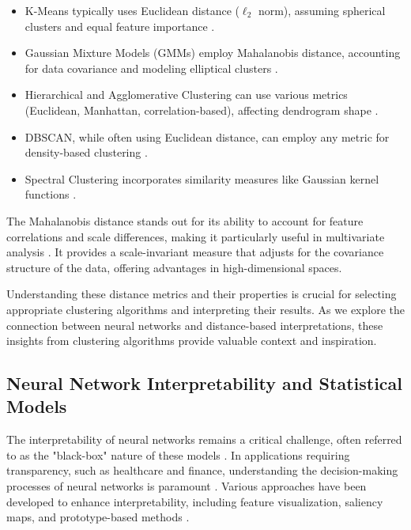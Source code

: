 \begin{itemize}
    \item K-Means typically uses Euclidean distance ($\ell_2$ norm), assuming spherical clusters and equal feature importance \citep{macqueen1967some}.
    
    \item Gaussian Mixture Models (GMMs) employ Mahalanobis distance, accounting for data covariance and modeling elliptical clusters \citep{reynolds2009gaussian}.
    
    \item Hierarchical and Agglomerative Clustering can use various metrics (Euclidean, Manhattan, correlation-based), affecting dendrogram shape \citep{murtagh1983survey}.
    
    \item DBSCAN, while often using Euclidean distance, can employ any metric for density-based clustering \citep{ester1996density}.
    
    \item Spectral Clustering incorporates similarity measures like Gaussian kernel functions \citep{von2007tutorial}.
\end{itemize}

The Mahalanobis distance stands out for its ability to account for feature correlations and scale differences, making it particularly useful in multivariate analysis \citep{mahalanobis1936generalized, demaesschalck2000mahalanobis}. It provides a scale-invariant measure that adjusts for the covariance structure of the data, offering advantages in high-dimensional spaces.

Understanding these distance metrics and their properties is crucial for selecting appropriate clustering algorithms and interpreting their results. As we explore the connection between neural networks and distance-based interpretations, these insights from clustering algorithms provide valuable context and inspiration.

\subsection{Neural Network Interpretability and Statistical Models}

The interpretability of neural networks remains a critical challenge, often referred to as the "black-box" nature of these models \citep{lipton2016mythos}. In applications requiring transparency, such as healthcare and finance, understanding the decision-making processes of neural networks is paramount \citep{rudin2019stop}. Various approaches have been developed to enhance interpretability, including feature visualization, saliency maps, and prototype-based methods \citep{erhan2009visualizing, simonyan2013deep, kim2016interpreting}.

